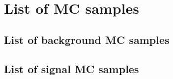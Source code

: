 \chapter{List of MC samples}
\label{ch:appendixOne}

\section{List of background MC samples}
\label{sec:MCBG}












\clearpage
\section{List of signal MC samples}
\label{sec:MCSig}


